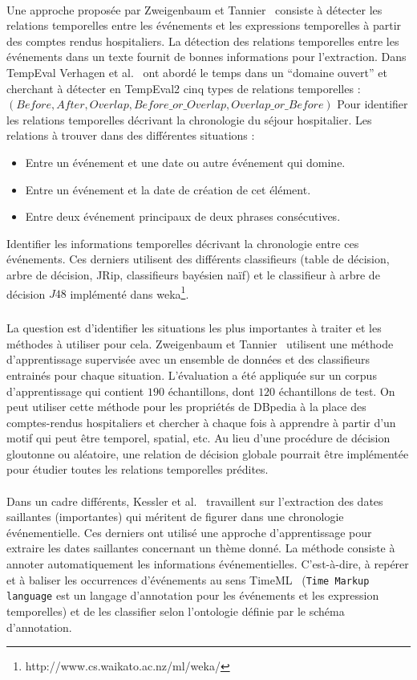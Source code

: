 \paragraph{}
Une approche proposée par Zweigenbaum et Tannier~\cite{zweigenbaum2013} consiste à détecter les relations temporelles entre les événements et les expressions temporelles à partir des comptes rendus hospitaliers.
La détection des relations temporelles entre les événements dans un texte fournit de bonnes informations pour l’extraction.
Dans TempEval Verhagen et al.~\cite{verhagen2010} ont abordé le temps dans un ``domaine ouvert” et cherchant à détecter en TempEval2 cinq types de relations temporelles :
\newline
$(Before, After, Overlap, Before\_or\_Overlap, Overlap\_or\_Before)$
Pour identifier les relations temporelles décrivant la chronologie du séjour hospitalier.
\newline
Les relations à trouver dans des différentes situations :
\begin{itemize}
\item{}Entre un événement et une date ou autre événement qui domine.
\item{}Entre un événement et la date de création de cet élément.
\item{}Entre deux événement principaux de deux phrases consécutives.
\end{itemize}
Identifier les informations temporelles décrivant la chronologie entre ces événements. Ces derniers utilisent des différents classifieurs (table de décision, arbre de décision, JRip, classifieurs bayésien naïf) et le classifieur à arbre de décision $J48$ implémenté dans weka\footnote{http://www.cs.waikato.ac.nz/ml/weka/}.
\subparagraph{}
La question est d’identifier les situations les plus importantes à traiter et les méthodes à utiliser pour cela.
Zweigenbaum et Tannier~\cite{zweigenbaum2013} utilisent une méthode d’apprentissage supervisée avec un ensemble de données et des classifieurs entrainés pour chaque situation.
L'évaluation a été appliquée sur un corpus d’apprentissage qui contient $190$ échantillons, dont $120$ échantillons de test. On peut utiliser cette méthode pour les propriétés de DBpedia à la place des comptes-rendus hospitaliers et chercher à chaque fois à apprendre à partir d'un motif qui peut être temporel, spatial, etc.
Au lieu d’une procédure de décision gloutonne ou aléatoire, une relation de décision globale pourrait être implémentée pour étudier toutes les relations temporelles prédites.
\paragraph{}
Dans un cadre différents, Kessler et al.~\cite{kessler2013} travaillent sur l'extraction des dates saillantes (importantes) qui méritent de figurer dans une chronologie événementielle.
Ces derniers ont utilisé une approche d’apprentissage pour extraire les dates saillantes concernant un thème donné. La méthode consiste à annoter automatiquement les informations événementielles. C’est-à-dire, à  repérer et à baliser les occurrences d’événements au sens TimeML~\cite{timml} ({\tt Time Markup language} est un langage d'annotation pour les événements et les expression temporelles) et de les classifier selon l’ontologie définie par le schéma d’annotation.
